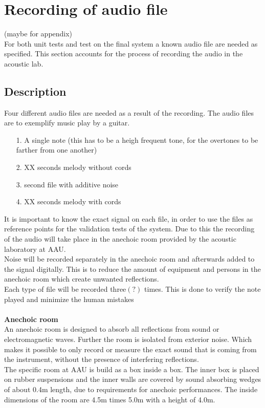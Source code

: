 \section{Recording of audio file}
(maybe for appendix)\\
For both unit tests and test on the final system a known audio file are needed as specified. This section accounts for the process of recording the audio in the acoustic lab.
\subsection{Description}
Four different audio files are needed as a result of the recording. The audio files are to exemplify music play by a guitar.    
\begin{itemize}
\item[1.] A single note (this has to be a heigh frequent tone, for the overtones to be farther from one another)
\item[2.] XX seconds melody without cords  
\item[3.] second file with additive noise   
\item[4.] XX seconds melody with cords 
\end{itemize} 
It is important to know the exact signal on each file, in order to use the files as reference points for the validation tests of the system. Due to this the recording of the audio will take place in the anechoic room provided by the acoustic laboratory at AAU.\\
Noise will be recorded separately in the anechoic room and afterwards added to the signal digitally. This is to reduce the amount of equipment and persons in the anechoic room which create unwanted reflections.  \\  
Each type of file will be recorded three$(?)$ times. This is done to verify the note played and minimize the human mistakes    
\\
\\
\textbf{Anechoic room}  \\
An anechoic room is designed to absorb all reflections from sound or electromagnetic waves. Further the room is isolated from exterior noise. Which makes it possible to only record or measure the exact sound that is coming from the instrument, without the presence of interfering reflections. \\ The specific room at AAU is build as a box inside a box. The inner box is placed on rubber suspensions and the inner walls are covered by sound absorbing wedges of about 0.4m length, due to requirements for anechoic performances. The inside dimensions of the room are 4.5m times 5.0m with a height of 4.0m.\cite{anechoic}

